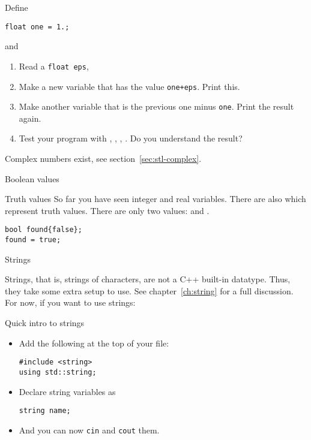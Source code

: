 \begin{exercise}
  \label{ex:macheps}
  Define 
\begin{lstlisting}
float one = 1.;
\end{lstlisting}
and
  \begin{enumerate}
  \item Read a \lstinline{float eps},
  \item Make a new variable that has the value \lstinline{one+eps}. Print
    this.
  \item Make another variable that is the previous one minus
    \lstinline{one}. Print the result again.
  \item Test your program with , , ,
    . Do you understand the result?
  \end{enumerate}
\end{exercise}

Complex numbers exist, see section~\ref{sec:stl-complex}.

 {Boolean values}

\begin{block}{Truth values}
  \label{sl:bool-var}
  So far you have seen integer and real variables. There are also
   which represent truth values. There are
  only two values:  and .
\begin{lstlisting}
bool found{false};
found = true;
\end{lstlisting}
\end{block}

 {Strings}

Strings, that is, strings of characters, are not a C++ built-in
datatype. Thus, they take some extra setup to use.
See chapter~\ref{ch:string} for a full discussion.
For now, if you
want to use strings:

\begin{block}{Quick intro to strings}
  \label{sl:quick-string}
  \begin{itemize}
  \item Add the following at the top of your file:
\begin{lstlisting}
#include <string>
using std::string;
\end{lstlisting}
\item Declare string variables as
\begin{lstlisting}
string name;
\end{lstlisting}
\item And you can now \lstinline{cin} and \lstinline{cout} them.
  \end{itemize}
\end{block}


